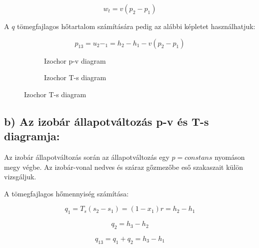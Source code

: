 \begin{equation*}
	w_t = v (p_2 - p_1)
\end{equation*}

A $q$ tömegfajlagos hőtartalom számítására pedig az alábbi képletet használhatjuk:

\begin{equation*}
p_{13} = u_2-_1 = h_2-h_1-v(p_2-p_1)
\end{equation*}


\begin{figure}[h]
	\centering
	\begin{subfigure}[b]{0.545\textwidth} 
		\centering
		\begin{tikzpicture}
		
		
		
		\end{tikzpicture}
		\caption{Izochor p-v diagram}
		
	\end{subfigure}
	\begin{subfigure}[b]{0.435\textwidth}
		\centering
		\begin{tikzpicture}
		
		
		
		\end{tikzpicture}
		\caption{Izochor T-s diagram}
		
	\end{subfigure}
\end{figure}

\pagebreak

\subsection*{b) Az izobár állapotváltozás p-v és T-s diagramja:}

Az izobár állapotváltozás során az állapotváltozás egy $p=constans$ nyomáson megy végbe. Az izobár-vonal nedves és száraz gőzmezőbe eső szakaszait külön vizsgáljuk.

A tömegfajlagos hőmennyiség számítása:

\begin{equation*}
q_1 = T_s (s_2-s_1) = (1-x_1)r = h_2-h_1
\end{equation*}

\begin{equation*}
q_2 = h_3-h_2
\end{equation*}

\begin{equation*}
q_{13} = q_1+q_2 = h_3-h_1
\end{equation*}


